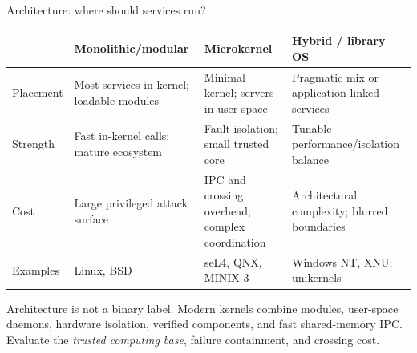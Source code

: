 \documentclass[aspectratio=169,11pt]{beamer}
\begin{document}
\begin{frame}{Architecture: where should services run?}
  \small
  \begin{tabularx}{\textwidth}{@{}lXXX@{}}
    \toprule
    & \textbf{Monolithic/modular} & \textbf{Microkernel} & \textbf{Hybrid / library OS} \\
    \midrule
    Placement & Most services in kernel; loadable modules & Minimal kernel; servers in user space & Pragmatic mix or application-linked services \\
    Strength & Fast in-kernel calls; mature ecosystem & Fault isolation; small trusted core & Tunable performance/isolation balance \\
    Cost & Large privileged attack surface & IPC and crossing overhead; complex coordination & Architectural complexity; blurred boundaries \\
    Examples & Linux, BSD & seL4, QNX, MINIX 3 & Windows NT, XNU; unikernels \\
    \bottomrule
  \end{tabularx}
  \vspace{0.6em}
  \begin{tcolorbox}[title=Graduate-level lens]
    Architecture is not a binary label. Modern kernels combine modules, user-space daemons, hardware isolation, verified components, and fast shared-memory IPC. Evaluate the \emph{trusted computing base}, failure containment, and crossing cost.
  \end{tcolorbox}
\end{frame}
\end{document}
